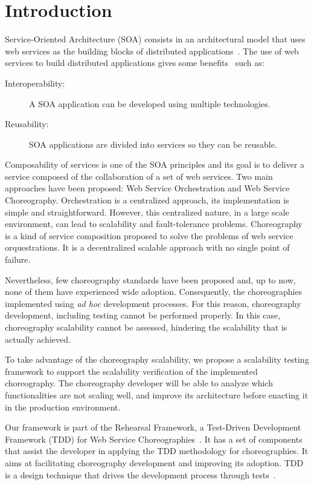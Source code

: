 \section{Introduction}
Service-Oriented Architecture (SOA) consists in an architectural model that uses web services as the building blocks of distributed applications~\citep{Hew09}. The use of web services to build distributed applications gives some benefits~\cite{Bean10} such as:

\begin{description}
\item[Interoperability:] A SOA application can be developed using multiple technologies.
\item[Reusability:] SOA applications are divided into services so they can be reusable.
\end{description}

Composability of services is one of the SOA principles and its goal is to deliver a service composed of the collaboration of a set of web services. Two main approaches have been proposed: Web Service Orchestration and Web Service Choreography. Orchestration is a centralized approach, its implementation is simple and straightforward. However, this centralized nature, in a large scale environment, can lead to scalability and fault-tolerance problems. Choreography is a kind of service composition proposed to solve the problems of web service orquestrations. It is a decentralized scalable approach with no single point of failure. 

Nevertheless, few choreography standards have been proposed and, up to now, none of them have experienced wide adoption. Consequently, the choreographies implemented using \emph{ad hoc} development processes. For this reason, choreography development, including testing cannot be performed properly. In this case, choreography scalability cannot be assessed, hindering the scalability that is actually achieved.

To take advantage of the choreography scalability, we propose a scalability testing framework to support the scalability verification of the implemented choreography. The choreography developer will be able to analyze which functionalities are not scaling well, and improve its architecture before enacting it in the production environment.

Our framework is part of the Rehearsal Framework, a Test-Driven Development Framework (TDD)  for Web Service Choreographies~\cite{Besson:2011:TAT:1982595.1982621}. It has a set of components that assist the developer in applying the TDD methodology for choreographies. It aims at facilitating choreography development and improving its adoption. TDD is a design technique that drives the development process through tests~\cite{Beck02}.  


